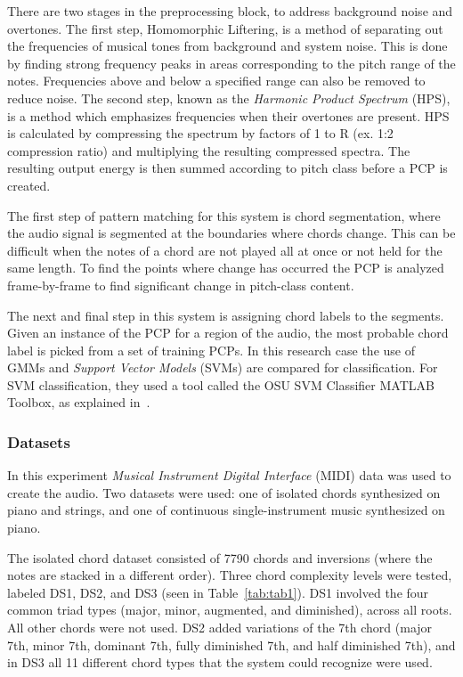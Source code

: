\documentclass{sig-alternate}
\begin{document}
There are two stages in the preprocessing block, to address background noise and overtones. The first step, Homomorphic Liftering, is a method of separating out the frequencies of musical tones from background and system noise. This is done by finding strong frequency peaks in areas corresponding to the pitch range of the notes. Frequencies above and below a specified range can also be removed to reduce noise. The second step, known as the \textit{Harmonic Product Spectrum} (HPS), is a method which emphasizes frequencies when their overtones are present. HPS is calculated by compressing the spectrum by factors of 1 to R (ex. 1:2 compression ratio) and multiplying the resulting compressed spectra. The resulting output energy is then summed according to pitch class before a PCP is created.


The first step of pattern matching for this system is chord segmentation, where the audio signal is segmented at the boundaries where chords change. This can be difficult when the notes of a chord are not played all at once or not held for the same length. To find the points where change has occurred the PCP is analyzed frame-by-frame to find significant change in pitch-class content. 


The next and final step in this system is assigning chord labels to the segments. Given an instance of the PCP for a region of the audio, the most probable chord label is picked from a set of training PCPs. In this research case the use of GMMs and \textit{Support Vector Models} (SVMs) are compared for classification. For SVM classification, they used a tool called the OSU SVM Classifier MATLAB Toolbox, as explained in~\cite{Morman:2006}.

\subsubsection{Datasets}

In this experiment \textit{Musical Instrument Digital Interface} (MIDI) data was used to create the audio. Two datasets were used: one of isolated chords synthesized on piano and strings, and one of continuous single-instrument music synthesized on piano. 

The isolated chord dataset consisted of 7790 chords and inversions (where the notes are stacked in a different order). Three chord complexity levels were tested, labeled DS1, DS2, and DS3 (seen in Table~\ref{tab:tab1}). DS1 involved the four common triad types (major, minor, augmented, and diminished), across all roots. All other chords were not used. DS2 added variations of the 7th chord (major 7th, minor 7th, dominant 7th, fully diminished 7th, and half diminished 7th), and in DS3 all 11 different chord types that the system could recognize were used.
\end{document}
